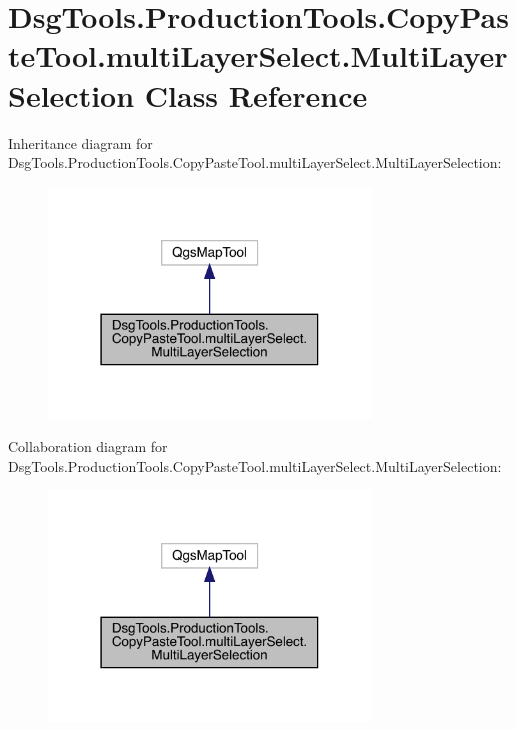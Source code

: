 \hypertarget{class_dsg_tools_1_1_production_tools_1_1_copy_paste_tool_1_1multi_layer_select_1_1_multi_layer_selection}{}\section{Dsg\+Tools.\+Production\+Tools.\+Copy\+Paste\+Tool.\+multi\+Layer\+Select.\+Multi\+Layer\+Selection Class Reference}
\label{class_dsg_tools_1_1_production_tools_1_1_copy_paste_tool_1_1multi_layer_select_1_1_multi_layer_selection}


Inheritance diagram for Dsg\+Tools.\+Production\+Tools.\+Copy\+Paste\+Tool.\+multi\+Layer\+Select.\+Multi\+Layer\+Selection\+:
\nopagebreak
\begin{figure}[H]
\begin{center}
\leavevmode
\includegraphics[width=243pt]{class_dsg_tools_1_1_production_tools_1_1_copy_paste_tool_1_1multi_layer_select_1_1_multi_layer_selection__inherit__graph}
\end{center}
\end{figure}


Collaboration diagram for Dsg\+Tools.\+Production\+Tools.\+Copy\+Paste\+Tool.\+multi\+Layer\+Select.\+Multi\+Layer\+Selection\+:
\nopagebreak
\begin{figure}[H]
\begin{center}
\leavevmode
\includegraphics[width=243pt]{class_dsg_tools_1_1_production_tools_1_1_copy_paste_tool_1_1multi_layer_select_1_1_multi_layer_selection__coll__graph}
\end{center}
\end{figure}
